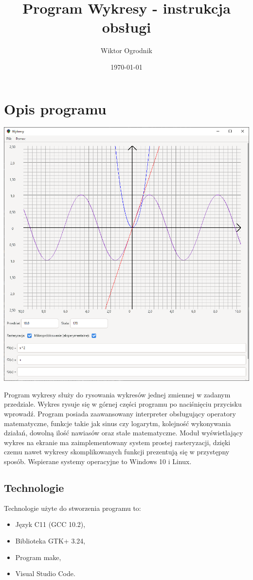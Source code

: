 \documentclass[a4paper]{article}
\author{Wiktor Ogrodnik}
\title{Program Wykresy - instrukcja obsługi}
\date{\today}
\begin{document}
\maketitle

\section{Opis programu}
\includegraphics[scale = 0.5]{img2.png}

Program wykresy służy do rysowania wykresów jednej zmiennej w zadanym przedziale. Wykres rysuje się w górnej części programu po naciśnięciu przycisku wprowadź. Program posiada zaawansowany interpreter obsługujący operatory matematyczne, funkcje takie jak sinus czy logarytm, kolejność wykonywania działań, dowolną ilość nawiasów oraz stałe matematyczne. Moduł wyświetlający wykres na ekranie ma zaimplementowany system prostej rasteryzacji, dzięki czemu nawet wykresy skomplikowanych funkcji prezentują się w przystępny sposób. Wspierane systemy operacyjne to Windows 10 i Linux.

\subsection{Technologie}
Technologie użyte do stworzenia programu to:
\begin{itemize}
    \item Język C11 (GCC 10.2),
    \item Biblioteka GTK+ 3.24,
    \item Program make,
    \item Visual Studio Code.
\end{itemize}
\end{document}
